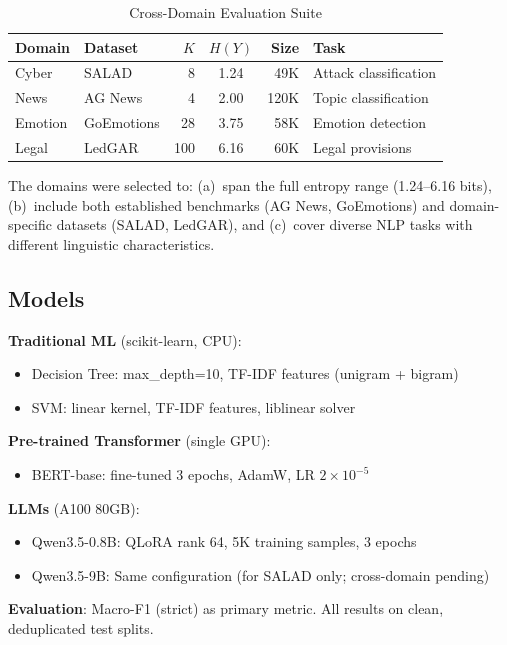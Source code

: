 \documentclass[review,3p]{elsarticle}
\begin{document}
\begin{table}[!ht]
\centering
\caption{Cross-Domain Evaluation Suite}
\label{tab:domains}
\begin{tabular}{llrcrl}
\toprule
\textbf{Domain} & \textbf{Dataset} & $K$ & $H(Y)$ & \textbf{Size} & \textbf{Task} \\
\midrule
Cyber & SALAD & 8 & 1.24 & 49K & Attack classification \\
News & AG News & 4 & 2.00 & 120K & Topic classification \\
Emotion & GoEmotions & 28 & 3.75 & 58K & Emotion detection \\
Legal & LedGAR & 100 & 6.16 & 60K & Legal provisions \\
\bottomrule
\end{tabular}
\end{table}

The domains were selected to: (a)~span the full entropy range (1.24--6.16 bits), (b)~include both established benchmarks (AG News, GoEmotions) and domain-specific datasets (SALAD, LedGAR), and (c)~cover diverse NLP tasks with different linguistic characteristics.

\subsection{Models}
\textbf{Traditional ML} (scikit-learn, CPU):
\begin{itemize}
\item Decision Tree: max\_depth=10, TF-IDF features (unigram + bigram)
\item SVM: linear kernel, TF-IDF features, liblinear solver
\end{itemize}

\textbf{Pre-trained Transformer} (single GPU):
\begin{itemize}
\item BERT-base: fine-tuned 3 epochs, AdamW, LR $2 \times 10^{-5}$
\end{itemize}

\textbf{LLMs} (A100 80GB):
\begin{itemize}
\item Qwen3.5-0.8B: QLoRA rank 64, 5K training samples, 3 epochs
\item Qwen3.5-9B: Same configuration (for SALAD only; cross-domain pending)
\end{itemize}

\textbf{Evaluation}: Macro-F1 (strict) as primary metric. All results on clean, deduplicated test splits.
\end{document}
